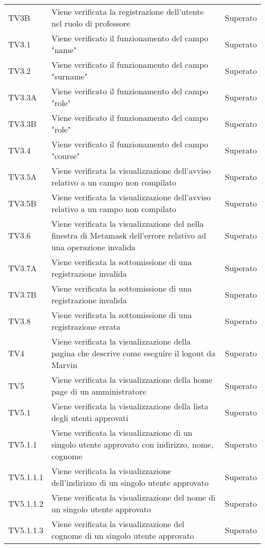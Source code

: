 \documentclass[PianoDiQualifica.tex]{subfiles}
\begin{document}
\begin{longtable}[H]{P{2cm}P{8.5cm}P{3cm}}
	TV3B & Viene verificata la registrazione dell'utente nel ruolo di professore & Superato \\ 
	TV3.1 & Viene verificato il funzionamento del campo "name" & Superato \\ 
	TV3.2 & Viene verificato il funzionamento del campo "surname" & Superato \\ 
	TV3.3A & Viene verificato il funzionamento del campo "role" & Superato \\ 
	TV3.3B & Viene verificato il funzionamento del campo "role" & Superato \\ 
	TV3.4 & Viene verificato il funzionamento del campo "course" & Superato \\ 
	TV3.5A & Viene verificata la visualizzazione dell'avviso relativo a un campo non compilato & Superato \\ 
	TV3.5B & Viene verificata la visualizzazione dell'avviso relativo a un campo non compilato & Superato \\ 
	TV3.6 & Viene verificata la visualizzazione del nella finestra di Metamask dell'errore relativo ad una operazione invalida & Superato \\ 
	TV3.7A & Viene verificata la sottomissione di una registrazione invalida & Superato \\ 
	TV3.7B & Viene verificata la sottomissione di una registrazione invalida & Superato \\ 
	TV3.8 & Viene verificata la sottomissione di una registrazione errata & Superato \\ 
	TV4 & Viene verificata la visualizzazione della pagina che descrive come eseguire il logout da Marvin & Superato \\ 
	TV5 & Viene verificata la visualizzazione della home page di un amministratore & Superato \\ 
	TV5.1 & Viene verificata la visualizzazione della lista degli utenti approvati & Superato \\ 
	TV5.1.1 & Viene verificata la visualizzazione di un singolo utente approvato con indirizzo, nome, cognome & Superato \\ 
	TV5.1.1.1 & Viene verificata la visualizzazione dell'indirizzo di un singolo utente approvato & Superato \\ 
	TV5.1.1.2 & Viene verificata la visualizzazione del nome di un singolo utente approvato & Superato \\ 
	TV5.1.1.3 & Viene verificata la visualizzazione del cognome di un singolo utente approvato & Superato \\ 

\end{longtable}
\end{document}
